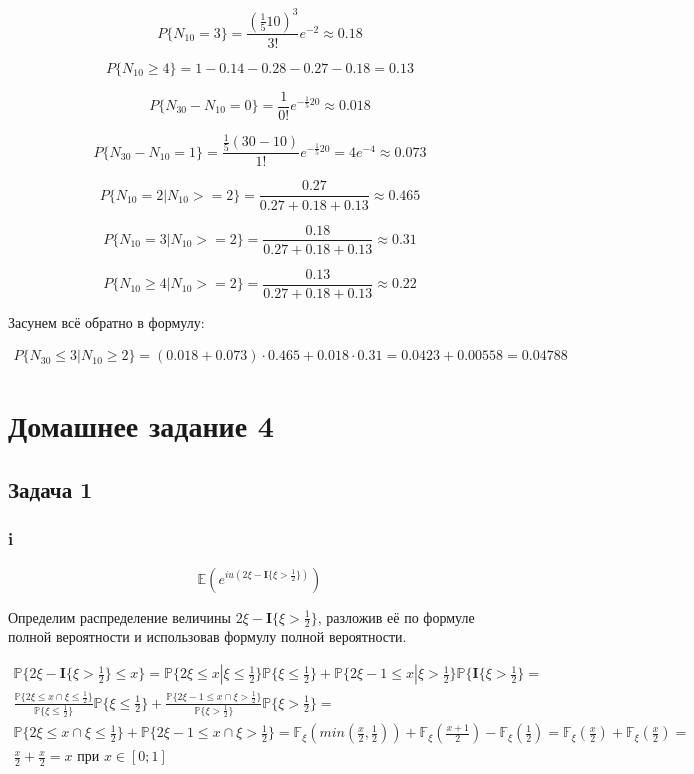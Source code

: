 \documentclass[a4paper,12pt]{article}
\def \mbf{\mathbf}
\def \mbb{\mathbb}
\def \P{\mbb{P}}
\def \E{\mbb{E}}
\def \F{\mbb{F}}
\def \I{\mbf{I}}
\begin{document}
\[ P\{N_{10} = 3 \} = \frac{(\frac{1}{5} 10)^3}{3!} e^{-2}  \approx 0.18\]

\[ P\{N_{10} \ge 4 \} =1 -0.14 -0.28 - 0.27 - 0.18 =0.13 \]



\[ P\{ N_{30} - N_{10} = 0 \} = \frac{1}{0!} e^{-\frac{1}{5}20} \approx 0.018\]

\[ P\{ N_{30} - N_{10} = 1 \} = \frac{\frac{1}{5}(30-10)}{1!} e^{-\frac{1}{5}20} = 4 e^{-4} \approx 0.073\]

\[ P\{ N_{10} = 2 | N_{10} >= 2\} = \frac{0.27}{0.27 + 0.18 + 0.13} \approx 0.465 \]

\[ P\{ N_{10} = 3 | N_{10} >= 2\} = \frac{0.18}{0.27 + 0.18 + 0.13} \approx 0.31 \]

\[ P\{ N_{10} \ge 4 | N_{10} >= 2\} = \frac{0.13}{0.27 + 0.18 + 0.13} \approx 0.22 \]


Засунем всё обратно в формулу:

\begin{equation}
\begin{aligned}
P\{ N_{30} \le 3 | N_{10} \ge 2 \}  = (0.018 + 0.073) \cdot 0.465 + 0.018 \cdot 0.31 = 0.0423 + 0.00558 = 0.04788
\end{aligned}
\end{equation}

\section{Домашнее задание 4}

\subsection{Задача 1}

\subsubsection{i}
\[ \E(e^{iu(2\xi - \I\{ \xi > \frac{1}{2} \})}) \]

Определим распределение величины  $ 2\xi - \I\{ \xi > \frac{1}{2} \}
$, разложив её по формуле полной вероятности и использовав формулу полной вероятности.

\begin{equation}
\begin{aligned}
\P\{  2\xi - \I\{ \xi > \frac{1}{2}\}  \le x \} = \P\{ 2\xi \le x | \xi \le \frac{1}{2} \}\P\{  \xi \le \frac{1}{2} \}+ \P\{ 2\xi - 1  \le x |  \xi > \frac{1}{2} \} \P\{  \I\{ \xi > \frac{1}{2} \} = \\ \frac{\P\{ 2\xi \le x \cap \xi \le \frac{1}{2} \}}{\P \{ \xi \le \frac{1}{2} \}} \P\{  \xi \le \frac{1}{2} \} +\frac{\P\{ 2\xi - 1 \le x \cap \xi > \frac{1}{2} \}}{\P \{ \xi > \frac{1}{2} \}} \P\{  \xi > \frac{1}{2} \} =\\ \P\{ 2\xi \le x \cap \xi \le \frac{1}{2} \} + \P\{ 2\xi - 1 \le x \cap \xi > \frac{1}{2} \} = \F_\xi(min(\frac{x}{2}, \frac{1}{2})) + \F_\xi(\frac{x + 1}{2}) - \F_\xi(\frac{1}{2}) = \F_\xi(\frac{x}{2}) + \F_\xi(\frac{x}{2}) =\\ \frac{x}{2} + \frac{x}{2} = x \text{ при } x\in[0;1]
\end{aligned}
\end{equation}
\end{document}
